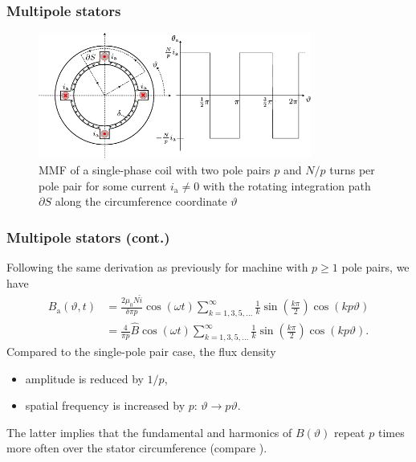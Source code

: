 \begin{frame}
	\frametitle{Multipole stators}
        \begin{figure}
                \centering
                \includegraphics[width=0.8\textwidth]{fig/lec05/MMF_single_phase_two_pole_pairs.pdf}
                \caption{MMF of a single-phase coil with two pole pairs $p$ and $N/p$ turns per pole pair for some current $i_\mathrm{a} \neq 0$ with the rotating integration path $\partial S$  along the circumference coordinate $\vartheta$}
                \label{fig: MMF_single_phase_two_pole_pairs}
        \end{figure}
\end{frame}

\begin{frame}
	\frametitle{Multipole stators (cont.)}
        Following the same derivation as previously for machine with $p\geq 1$ pole pairs, we have    \begin{equation}
            \begin{split}
                B_\mathrm{a}(\vartheta, t) &= \frac{2 \mu_0 N \hat{i}}{\delta \pi p}\cos(\omega t)\sum_{k=1,3,5,\ldots}^{\infty}   \frac{1}{k}\sin(\frac{k \pi}{2}) \cos(k p \vartheta)\\ &= \frac{4}{\pi p} \hat{B} \cos(\omega t)\sum_{k=1,3,5,\ldots}^{\infty}   \frac{1}{k}\sin(\frac{k \pi}{2}) \cos(k p \vartheta).
            \end{split}
            \label{eq:B_single_phase_coil_fourier_series_multi_pole}
        \end{equation}
        Compared to the single-pole pair case, the flux density 
        \begin{itemize}
            \item amplitude is reduced by $1/p$,
            \item spatial frequency is increased by $p$: $\vartheta \rightarrow p \vartheta$. 
        \end{itemize}
        The latter implies that the fundamental and harmonics of $B(\vartheta)$ repeat $p$ times more often over the stator circumference (compare ).
\end{frame}


